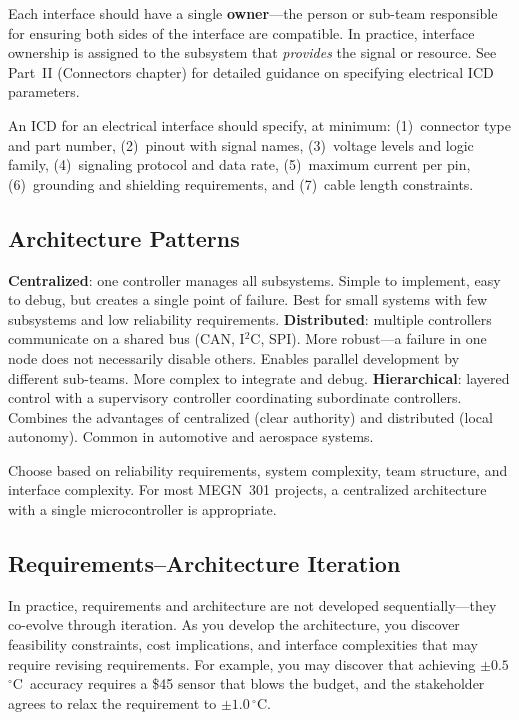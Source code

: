 \documentclass[11pt,letterpaper,twoside,openany]{book}
\newcommand{\degC}{\ensuremath{{}^{\circ}\text{C}}}
\begin{document}
Each interface should have a single \textbf{owner}---the person or sub-team responsible for ensuring both sides of the interface are compatible. In practice, interface ownership is assigned to the subsystem that \emph{provides} the signal or resource. See Part~II (Connectors chapter) for detailed guidance on specifying electrical ICD parameters.

An ICD for an electrical interface should specify, at minimum: (1)~connector type and part number, (2)~pinout with signal names, (3)~voltage levels and logic family, (4)~signaling protocol and data rate, (5)~maximum current per pin, (6)~grounding and shielding requirements, and (7)~cable length constraints.

\subsection{Architecture Patterns}
\textbf{Centralized}: one controller manages all subsystems. Simple to implement, easy to debug, but creates a single point of failure. Best for small systems with few subsystems and low reliability requirements. \textbf{Distributed}: multiple controllers communicate on a shared bus (CAN, I$^2$C, SPI). More robust---a failure in one node does not necessarily disable others. Enables parallel development by different sub-teams. More complex to integrate and debug. \textbf{Hierarchical}: layered control with a supervisory controller coordinating subordinate controllers. Combines the advantages of centralized (clear authority) and distributed (local autonomy). Common in automotive and aerospace systems.

Choose based on reliability requirements, system complexity, team structure, and interface complexity. For most MEGN~301 projects, a centralized architecture with a single microcontroller is appropriate.

\subsection{Requirements--Architecture Iteration}
In practice, requirements and architecture are not developed sequentially---they co-evolve through iteration. As you develop the architecture, you discover feasibility constraints, cost implications, and interface complexities that may require revising requirements. For example, you may discover that achieving $\pm 0.5$\,\degC\ accuracy requires a \$45 sensor that blows the budget, and the stakeholder agrees to relax the requirement to $\pm 1.0$\,\degC.
\end{document}
